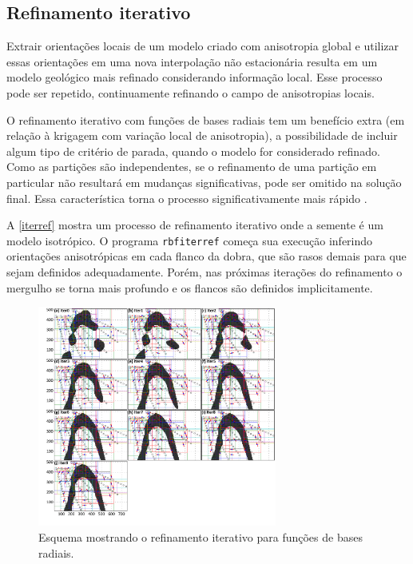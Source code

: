 \subsection{Refinamento iterativo}

Extrair orientações locais de um modelo criado com anisotropia global e utilizar essas orientações em uma nova interpolação não estacionária resulta em um modelo geológico mais refinado considerando informação local. Esse processo pode ser repetido, continuamente refinando o campo de anisotropias locais. 

O refinamento iterativo com funções de bases radiais tem um benefício extra (em relação à krigagem com variação local de anisotropia), a possibilidade de incluir algum tipo de critério de parada, quando o modelo for considerado refinado. Como as partições são independentes, se o refinamento de uma partição em particular não resultará em mudanças significativas, pode ser omitido na solução final. Essa característica torna o processo significativamente mais rápido \cite{martin2017implicitmodeling}.

A \autoref{iterref} mostra um processo de refinamento iterativo onde a semente é um modelo isotrópico. O programa \verb|rbfiterref| começa sua execução inferindo orientações anisotrópicas em cada flanco da dobra, que são rasos demais para que sejam definidos adequadamente. Porém, nas próximas iterações do refinamento o mergulho se torna mais profundo e os flancos são definidos implicitamente.

\begin{figure}[H]
\caption{\label{iterref} Esquema mostrando o refinamento iterativo para funções de bases radiais.}
	\begin{center}
		\includegraphics[width=0.7\textwidth]{capitulo_2/iterref.jpg}
	\end{center}
\end{figure}

